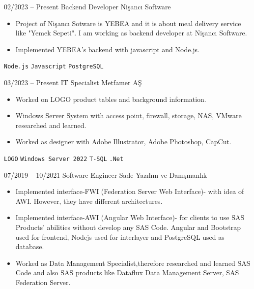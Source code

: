 \documentclass[9pt]{developercv} %
\begin{document}
\begin{entrylist}
	\entry
        {02/2023 -- Present}
		{Backend Developer}
		{Nişancı Software}
		{\vspace{-10pt}
        \begin{itemize}[noitemsep,topsep=0pt,parsep=0pt,partopsep=0pt, leftmargin=-1pt]
            \item { Project of Nişancı Sotware is YEBEA and it is about meal delivery service like "Yemek Sepeti". I am working as backend developer at Nişancı Software. }
            \item { Implemented YEBEA's backend with javascript and Node.js.}
        \end{itemize} 
        \texttt{Node.js} \slashsep \texttt{Javascript} \slashsep \texttt{PostgreSQL}}
        \entry
        {03/2023 -- Present}
		{IT Specialist}
		{Metfamer AŞ}
		{\vspace{-10pt}
        \begin{itemize}[noitemsep,topsep=0pt,parsep=0pt,partopsep=0pt, leftmargin=-1pt]
            \item { Worked on LOGO product tables and background information. }
            \item { Windows Server System with access point, firewall, storage, NAS, VMware researched and learned. }
            \item { Worked as designer with Adobe Illustrator, Adobe Photoshop, CapCut. }
        \end{itemize} 
        \texttt{LOGO} \slashsep \texttt{Windows Server 2022} \slashsep \texttt{T-SQL} \slashsep \texttt{.Net}}
	\entry
		{07/2019 -- 10/2021}
		{Software Engineer}
		{Sade Yazılım ve Danışmanlık}
		{\vspace{-10pt}
        \begin{itemize}[noitemsep,topsep=0pt,parsep=0pt,partopsep=0pt, leftmargin=-1pt]
            \item { Implemented interface-FWI (Federation Server Web Interface)- with idea of AWI. However, they have different architectures. }
            \item { Implemented interface-AWI (Angular Web Interface)- for clients to use SAS Products' abilities without develop any SAS Code. Angular and Bootstrap used for frontend, Nodejs used for interlayer and PostgreSQL used as database. }
            \item { Worked as Data Management Specialist,therefore researched and learned SAS Code and also SAS products like Dataflux Data Management Server, SAS Federation Server. }

\end{itemize}}
\end{entrylist}
\end{document}
